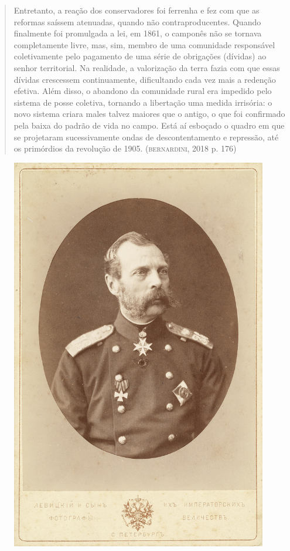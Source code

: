 \documentclass{article}
\begin{document}
\begin{quote}
Entretanto, a reação dos conservadores foi ferrenha e fez com que as
reformas saíssem atenuadas, quando não contraproducentes. Quando
finalmente foi promulgada a lei, em 1861, o camponês não se tornava
completamente livre, mas, sim, membro de uma comunidade responsável
coletivamente pelo pagamento de uma série de obrigações (dívidas) ao
senhor territorial. Na realidade, a valorização da terra fazia com que
essas dívidas crescessem continuamente, dificultando cada vez mais a
redenção efetiva. Além disso, o abandono da comunidade rural era
impedido pelo sistema de posse coletiva, tornando a libertação uma
medida irrisória: o novo sistema criara males talvez maiores que o
antigo, o que foi confirmado pela baixa do padrão de vida no campo. Está
aí esboçado o quadro em que se projetaram sucessivamente ondas de
descontentamento e repressão, até os primórdios da revolução de 1905.
(\textsc{bernardini}, 2018 p. 176)
\end{quote}

\begin{figure}[ht!]
\includegraphics[width=\textwidth]{./images/PNLD0049-06.png}
\end{figure}
\end{document}
